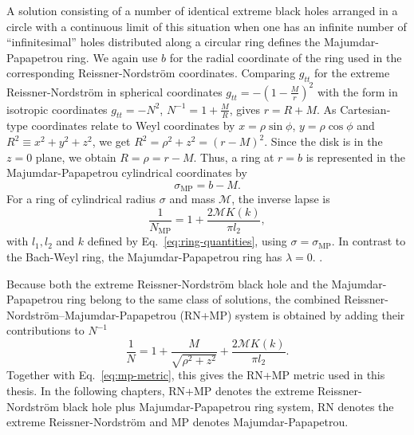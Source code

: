 A solution consisting of a number
of identical extreme black holes arranged in a circle with a continuous limit of this situation when one has an
infinite number of “infinitesimal” holes distributed along
a circular ring defines the Majumdar-Papapetrou ring. We again use \(b\) for the radial coordinate of the ring used in
the corresponding Reissner-Nordstr\"om coordinates. Comparing $g_{tt}$ for the extreme
Reissner-Nordstr\"om in spherical coordinates \(g_{tt}=-(1-\frac{M}{r})^2\) with the form in isotropic coordinates \(g_{tt}=-N^2\), \(N^{-1}=1+\frac{M}R{}\), gives
\(r=R+M\). As Cartesian-type coordinates relate to Weyl coordinates by $x = \rho\sin\phi$, $y = \rho\cos\phi$ and $R^2\equiv x^2+y^2+z^2$, we get $R^2 = \rho^2 + z^2=(r-M)^2$. Since the disk is in the $z=0$ plane, we obtain $R=\rho=r-M$.
Thus, a ring at \(r=b\) is represented in the
Majumdar-Papapetrou cylindrical coordinates by
\begin{equation}
    \sigma_{\mathrm{MP}}
    =
    b-M.
    \label{eq:rn-mp-ring-radius}
\end{equation}
For a ring of cylindrical radius \(\sigma\) and mass \(\mathcal{M}\), the
inverse lapse is
\begin{equation}
    \frac{1}{N_{\mathrm{MP}}}
    =
    1
    +
    \frac{2\mathcal{M}K(k)}{\pi l_2},
    \label{eq:mp-ring-lapse}
\end{equation}
with \(l_1,l_2\) and \(k\) defined by Eq.~\eqref{eq:ring-quantities}, using
\(\sigma=\sigma_{\mathrm{MP}}\). In
contrast to the Bach-Weyl ring, the Majumdar-Papapetrou ring has
\(\lambda=0\).
\cite{Semerak2016,Polcar2019}.

Because both the extreme Reissner-Nordstr\"om black hole and the
Majumdar-Papapetrou ring belong to the same class of solutions, the combined
Reissner-Nordstr\"om--Majumdar-Papapetrou (RN+MP) system is obtained by
adding their contributions to \(N^{-1}\)
\begin{equation}
    \frac{1}{N}
    =
    1
    +
    \frac{M}{\sqrt{\rho^2+z^2}}
    +
    \frac{2\mathcal{M}K(k)}{\pi l_2}.
    \label{eq:ern-mp-superposition}
\end{equation}
Together with Eq.~\eqref{eq:mp-metric}, this gives the RN+MP metric used in
this thesis. In the following chapters, RN+MP denotes the
extreme Reissner-Nordstr\"om black hole plus Majumdar-Papapetrou ring
system, RN denotes the extreme Reissner-Nordstr\"om and MP denotes
Majumdar-Papapetrou.
